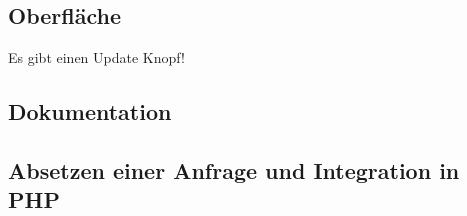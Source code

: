 \subsection{Oberfläche}

Es gibt einen Update Knopf!


\subsection{Dokumentation}


\subsection{Absetzen einer Anfrage und Integration in PHP}

